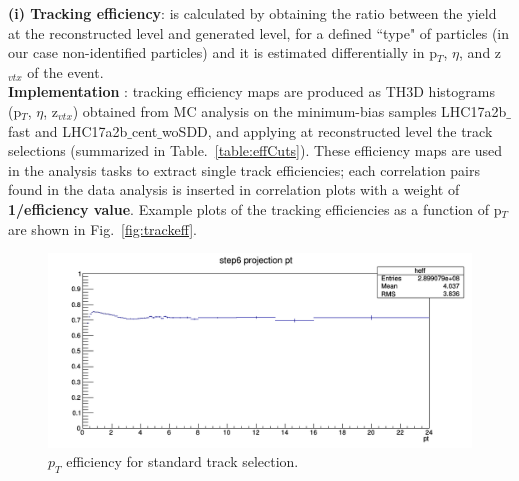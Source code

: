 
{\bf \normalsize (i) Tracking efficiency}: is calculated by obtaining the ratio between the yield at the reconstructed level and generated level, for a defined ``type" of particles (in our case non-identified particles) and it is estimated differentially in p$_T$, $\eta$, and z$_{vtx}$ of the event.\\
{\bf Implementation }: tracking efficiency maps are produced as TH3D histograms (p$_T$, $\eta$, z$_{vtx}$) obtained from MC analysis on the minimum-bias samples LHC17a2b$\_$fast and LHC17a2b$\_$cent$\_$woSDD, and applying at reconstructed level the track selections (summarized in Table.~\ref{table:effCuts}). These efficiency maps are used in the analysis tasks to extract single track efficiencies; each correlation pairs found in the data analysis is inserted in correlation plots with a weight of {\bf 1/efficiency value}. Example plots of the tracking efficiencies as a function of p$_T$ are shown in Fig.~\ref{fig:trackeff}.




\begin{figure}[h]
	\centering
	\includegraphics[scale=0.35]{figures/Effs/TrackEfficiencyPlots_zVtxbin5_a2b_default_1Dmap.png}
	\caption{$p_T$ efficiency for standard track selection.}
	\label{fig:trackeffvsspecies}	
\end{figure}

